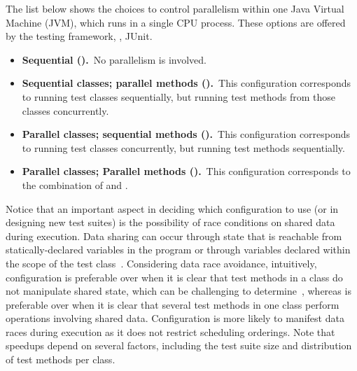 The list below shows the choices to control parallelism within one
Java Virtual Machine (JVM), which runs in a single CPU process.  These
options are offered by the testing framework, \eg{}, JUnit.

\begin{itemize}
\item
    \textbf{Sequential (\Seq).}~No parallelism is involved.
\item
    \textbf{Sequential classes; parallel methods
      (\SeqClassParMeth).}~This configuration corresponds to running
    test classes sequentially, but running test methods from those
    classes concurrently.
\item
    \textbf{Parallel classes; sequential methods
      (\ParClassSeqMeth{}).}~This configuration corresponds to running
    test classes concurrently, but running test methods sequentially.
\item
    \textbf{Parallel classes; Parallel methods
      (\ParClassParMeth).}~This configuration corresponds to the
    combination of \SeqClassParMeth{} and \ParClassSeqMeth{}.  
\end{itemize}


Notice that an important aspect in deciding which configuration to use
(or in designing new test suites) is the possibility of race
conditions on shared data during execution.  Data sharing can occur
through state that is reachable from statically-declared variables in
the program or through variables declared within the scope of the test
class~\cite{luo-etal-fse2014}.  Considering data race avoidance,
intuitively, configuration \SeqClassParMeth{} is preferable over
\ParClassSeqMeth{} when it is clear that test methods in a class do
not manipulate shared state, which can be challenging to
determine~\cite{bell-etal-esecfse2015}, whereas \ParClassSeqMeth{} is
preferable over \SeqClassParMeth{} when it is clear that several test
methods in one class perform operations involving shared data.
Configuration \ParClassParMeth{} is more likely to manifest data races
during execution as it does not restrict scheduling orderings. Note
that speedups depend on several factors, including the test suite size
and distribution of test methods per class.

